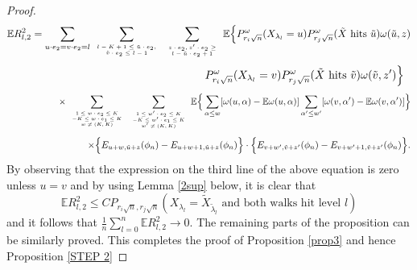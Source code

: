 \documentclass[11pt]{amsart}
\begin{document}
\begin{proof}
\[\mathbb{E}R_{l,2}^2=\sum_{u\cdot e_2=v\cdot e_2=l} \sum_{\begin{tiny}\begin{array}{c}l-K+1\le \tilde{u}\cdot e_2,\\ \tilde{v}\cdot e_2 \le l-1\end{array}\end{tiny}} \sum_{\begin{tiny}\begin{array}{c}z\cdot e_2,z'\cdot e_2 \ge \\ l-\tilde{u}\cdot e_2+1\end{array}\end{tiny}} \mathbb{E}\Big{\{}P_{r_i\sqrt{n}}^{\omega}(X_{\lambda_l}=u)P_{r_j\sqrt{n}}^{\omega}(\tilde{X} \mbox{ hits }\tilde{u})\omega(\tilde{u},z)\]
\[\hspace{6cm}  P_{r_i\sqrt{n}}^{\omega}(X_{\lambda_l}=v)P_{r_j\sqrt{n}}^{\omega}(\tilde{X} \mbox{ hits }\tilde{v})\omega(\tilde{v},z')  \Big{\}}\]
\[ \hspace{2cm} \times \sum_{  \begin{tiny} \begin{array}{c}1\le  w\cdot e_2  \leq K \\
 -K \le  w\cdot e_1  \leq K \\ w \ne (K,K) \end{array}\end{tiny}} \sum_{  \begin{tiny} \begin{array}{c}1\le  w'\cdot e_2  \leq K \\
 -K \le  w'\cdot e_1  \leq K \\ w' \ne (K,K) \end{array}\end{tiny}} \mathbb{E}\Big{\{} \sum_{\alpha \le w} [\omega(u,\alpha)-\mathbb{E}\omega(u,\alpha)]\sum_{\alpha' \le  w'}[\omega(v,\alpha')-\mathbb{E}\omega(v,\alpha')]\Big{\}} \]
\[ \hspace{3cm}\times \Big{\{} E_{u+w,\tilde{u}+z}(\phi_n)-E_{u+w+1,\tilde{u}+z}(\phi_n)\Big{\}}\cdot\Big{\{} E_{v+w',\tilde{v}+z'}(\phi_n)-E_{v+w'+1,\tilde{v}+z'}(\phi_n)\Big{\}}.\]
By observing that the expression on the third line of the above equation is zero unless $u=v$ and by using Lemma \ref{2sup} below, it is clear that 
\[ \mathbb{E}R_{l,2}^2 \le C P_{r_i \sqrt{n},r_j \sqrt{n}}(X_{\lambda_l}=\tilde{X}_{\tilde{\lambda}_l} \mbox{ and both walks hit level }l ) \]
and it follows that \begin{math} \frac{1}{n}\sum_{l=0}^n \mathbb{E}R_{l,2}^2 \to 0.\end{math} The remaining parts of the proposition can be similarly proved. This completes the proof of Proposition \ref{prop3} and hence Proposition \ref{STEP 2}
\end{proof}
\end{document}
